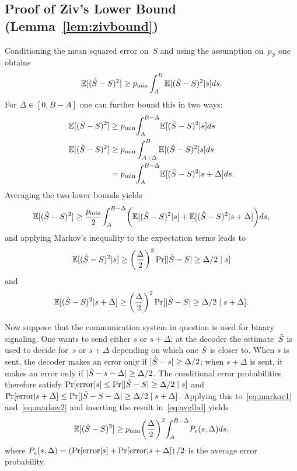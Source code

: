 \begin{subappendices}
  \section{Proof of Ziv's Lower Bound (Lemma~\ref{lem:zivbound})}
  \label{app:zivboundproof}

  Conditioning the mean squared error on~$S$ and using the assumption on~$p_S$
  one obtains
  \begin{equation*}
    {\mathbb{E}[({\hat{S}}- S)^2]} \ge {p_{\min}} \int_A^B {\mathbb{E}[({\hat{S}} - S)^2 | s]} ds.
  \end{equation*}
  For $\Delta \in [0, B-A]$ one can further bound this in two ways:
  \begin{align*}
    {\mathbb{E}[({\hat{S}}- S)^2]} &\ge {p_{\min}} {\int_A^{B-\Delta}} {\mathbb{E}[({\hat{S}}- S)^2 | s]} ds \\
    {\mathbb{E}[({\hat{S}} - S)^2]} &\ge {p_{\min}} \int_{A+\Delta}^B {\mathbb{E}[({\hat{S}} - S)^2 | s]} ds \\
    &= {p_{\min}} {\int_A^{B-\Delta}} {\mathbb{E}[({\hat{S}} - S)^2 | s + \Delta]} ds.
  \end{align*}
  Averaging the two lower bounds yields
  \begin{equation}
    \label{eq:avglbd}
    {\mathbb{E}[({\hat{S}}- S)^2]} \ge \frac{{p_{\min}}}{2} {\int_A^{B-\Delta}} \bigg( {\mathbb{E}[({\hat{S}} - S)^2 | s]} + \\
    {\mathbb{E}[({\hat{S}} - S)^2 | s + \Delta]} \bigg) ds,
  \end{equation}
  and applying Markov's inequality to the expectation terms leads to
  \begin{equation}
    \label{eq:markov1}
    {\mathbb{E}[({\hat{S}}- S)^2 | s]} \ge {\left(\frac{\Delta}{2}\right)^2} \Pr[|{\hat{S}} - S| \ge \Delta/2 \mid s]
  \end{equation}
  and
  \begin{equation}
    \label{eq:markov2}
    {\mathbb{E}[({\hat{S}}- S)^2 | s + \Delta]} \ge {\left(\frac{\Delta}{2}\right)^2} \Pr[|{\hat{S}} - S| \ge \Delta/2 \mid s+\Delta].
  \end{equation}

  Now suppose that the communication system in question is used for binary
  signaling. One wants to send either $s$ or $s+\Delta$; at the decoder the
  estimate~${\hat{S}}$ is used to decide for~$s$ or $s + \Delta$ depending on which
  one ${\hat{S}}$ is closer to. When $s$ is sent, the decoder makes an error only if
  $|{\hat{S}} - s| \ge \Delta/2$; when $s + \Delta$ is sent, it makes an error only if
  $|{\hat{S}} - s - \Delta| \ge \Delta/2$. The conditional error probabilities
  therefore satisfy $\Pr[\text{error} | s] \le \Pr[|{\hat{S}} - S| \ge \Delta/2 \mid
  s]$ and $\Pr[\text{error} | s + \Delta] \le \Pr[|{\hat{S}} - S - \Delta| \ge
  \Delta/2 \mid s + \Delta]$. Applying this to~\eqref{eq:markov1}
  and~\eqref{eq:markov2} and inserting the result in~\eqref{eq:avglbd} yields
  \begin{equation}
    \label{eq:zivalmostproved}
    {\mathbb{E}[({\hat{S}}- S)^2]} \ge {p_{\min}} {\left(\frac{\Delta}{2}\right)^2} {\int_A^{B-\Delta}} P_e(s, \Delta) ds,
  \end{equation}
  where $P_e(s, \Delta) = \left(\Pr[\text{error}|s] + \Pr[\text{error}|s +
  \Delta] \right)/2$ is the average error probability.


\end{subappendices}
